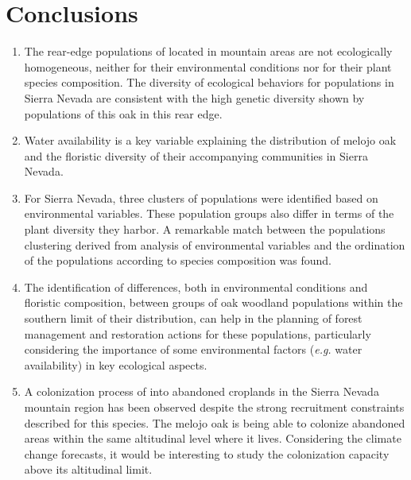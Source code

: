 \section*{Conclusions}\label{sec:conclussions:en}

\begin{enumerate}
\renewcommand{\labelenumi}{\textbf{\textcolor{ctcolormain}{\arabic{enumi}.}}}

    \item The rear-edge populations of \Qpy located in mountain areas are not ecologically homogeneous, neither for their environmental conditions nor for their plant species composition. The diversity of ecological behaviors for \Qp populations in Sierra Nevada are consistent with the high genetic diversity shown by populations of this oak in this rear edge.
    
    \item Water availability is a key variable explaining the distribution of melojo oak and the floristic diversity of their accompanying communities in Sierra Nevada.
    
    \item For Sierra Nevada, three clusters of \Qp populations were identified based on environmental variables. These population groups also differ in terms of the plant diversity they harbor. A remarkable match between the populations clustering derived from analysis of environmental variables and the ordination of the populations according to species composition was found.
    
    \item The identification of differences, both in environmental conditions and floristic composition, between groups of oak woodland populations within the southern limit of their distribution, can help in the planning of forest management and restoration actions for these populations, particularly considering the importance of some environmental factors (\emph{e.g.} water availability) in key ecological aspects.
    
    \item A colonization process of \Qp into abandoned croplands in the Sierra Nevada mountain region has been observed despite the strong recruitment constraints described for this species. The melojo oak is being able to colonize abandoned areas within the same altitudinal level where it lives. Considering the climate change forecasts, it would be interesting to study the colonization capacity above its altitudinal limit. 
    

\end{enumerate}
